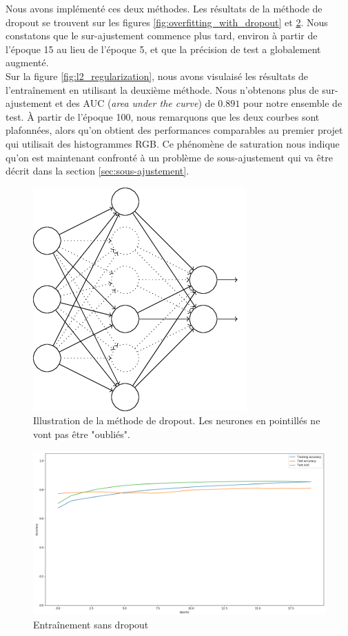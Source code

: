 \documentclass[a4paper,11pt]{article}
\begin{document}
    Nous avons implémenté ces deux méthodes.
    Les résultats de la méthode de dropout se trouvent sur les figures \ref{fig:overfitting_with_dropout} et \ref{fig:overfitting_without_dropout}.
    Nous constatons que le sur-ajustement commence plus tard, environ à partir de l'époque 15 au lieu de l'époque 5, et que la précision de test a globalement augmenté.
    \\
    Sur la figure \ref{fig:l2_regularization}, nous avons visulaisé les résultats de l'entraînement en utilisant la deuxième méthode.
    Nous n'obtenons plus de sur-ajustement et des AUC (\textit{area under the curve}) de $0.891$ pour notre ensemble de test.
    À partir de l'époque 100, nous remarquons que les deux courbes sont plafonnées, alors qu'on obtient des performances comparables au premier projet qui utilisait des histogrammes RGB.
    Ce phénomène de saturation nous indique qu'on est maintenant confronté à un problème de sous-ajustement qui va être décrit dans la section \ref{sec:sous-ajustement}.

	\begin{figure}[H]
	    \centering
	    \includegraphics[scale=0.5]{dropout_illustration.png}
	    \caption{Illustration de la méthode de dropout. Les neurones en pointillés ne vont pas être "oubliés".}
	    \label{fig:dropout_illustration}
	\end{figure}

	\begin{figure}[H]
	    \centering
	    \includegraphics[scale=0.3]{overfitting_without_dropout.png}
	    \caption{Entraînement sans dropout}
	    \label{fig:overfitting_without_dropout}
	\end{figure}
\end{document}
